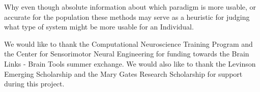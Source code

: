 \documentclass[12pt]{article}
\begin{document}
Why even though absolute information about which paradigm is more
usable, or accurate for the population these methods may serve as a
heuristic for judging what type of system might be more usable for
an Individual.


We would like to thank the Computational Neuroscience Training Program
and the Center for Sensorimotor Neural Engineering for funding towards
the Brain Links - Brain Tools summer exchange. We would also like to
thank the Levinson Emerging Scholarship and the Mary Gates Research
Scholarship for support during this project.

\clearpage    

  
\end{document}
